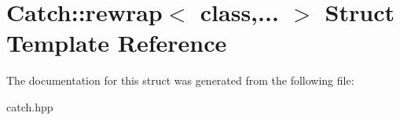 \hypertarget{structCatch_1_1rewrap}{}\section{Catch\+::rewrap$<$ class,... $>$ Struct Template Reference}
\label{structCatch_1_1rewrap}


The documentation for this struct was generated from the following file\+:\begin{DoxyCompactItemize}
\item 
catch.\+hpp\end{DoxyCompactItemize}
